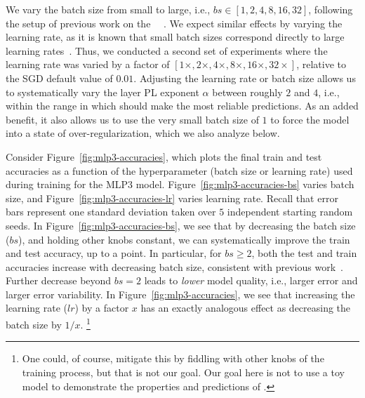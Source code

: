We vary the batch size from small to large, i.e., $bs\in[1,2,4,8,16,32]$, following the setup of previous work on the \HTSR~\Phenomenology~\cite{MM18_TR_JMLRversion}. 
We expect similar effects by varying the learning rate, as it is known that small batch sizes correspond directly to large learning rates~\cite{SKYL17_TR,WT11}. 
Thus, we conducted a second set of experiments where the learning rate was varied by a factor of 
$[1\times,2\times,4\times,8\times,16\times,32\times]$, relative to the SGD default value of $0.01$. 
Adjusting the learning rate or batch size allows us to systematically vary the layer PL exponent $\alpha$ between roughly $2$ and $4$, i.e., within the range in which \SETOL should make the most reliable predictions. 
As an added benefit, it also allows us to use the very small batch size of $1$ to force the model into a state of over-regularization, which we also analyze below.



Consider Figure~\ref{fig:mlp3-accuracies}, which plots the final train and test accuracies as a function of the hyperparameter (batch size or learning rate) used during training for the MLP3 model.
Figure~\ref{fig:mlp3-accuracies-bs} varies batch size, and Figure~\ref{fig:mlp3-accuracies-lr} varies learning rate.
Recall that error bars represent one standard deviation taken over $5$ independent starting random seeds. 
In Figure~\ref{fig:mlp3-accuracies-bs}, we see that by decreasing the batch size ($bs$), and holding other knobs constant, we can systematically improve the train and test accuracy, up to a point. 
In particular, for $bs \ge 2$, both the test and train accuracies increase with decreasing batch size, consistent with previous work~\cite{MM18_TR_JMLRversion}.
Further decrease beyond $bs=2$ leads to \emph{lower} model quality, i.e., larger error and larger error variability.
In Figure~\ref{fig:mlp3-accuracies}, we see that increasing the learning rate ($lr$) by a factor $x$ has an exactly analogous effect as decreasing the batch size by $1/x$.%
\footnote{One could, of course, mitigate this by fiddling with other knobs of the training process, but that is not our goal.  Our goal here is not to use a toy model to demonstrate the properties and predictions of \SETOL.}

